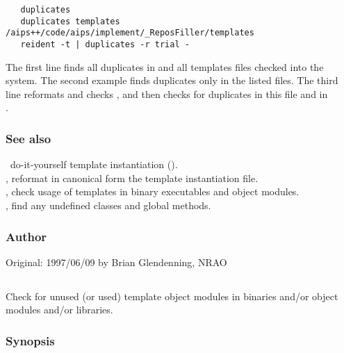 \begin{verbatim}
   duplicates
   duplicates templates /aips++/code/aips/implement/_ReposFiller/templates
   reident -t | duplicates -r trial - 
\end{verbatim}

The first line finds all duplicates in  and all templates
files checked into the system. The second example finds duplicates only in
the listed files. The third line reformats and checks , and
then checks for duplicates in this file and in \\
.

\subsubsection*{See also}

\aipspp\ do-it-yourself template instantiation ().\\
, reformat in canonical form the template instantiation file.\\
, check usage of templates in binary executables and object
modules.\\
, find any undefined classes and global methods.

\subsubsection*{Author}

Original: 1997/06/09 by Brian Glendenning, NRAO


\newpage
\subsection{}
\label{unused}

Check for unused (or used) template object modules in binaries and/or object
modules and/or libraries.

\subsubsection*{Synopsis}

\begin{synopsis}
\end{synopsis}

